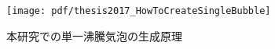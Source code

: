 \begin{figure}[ht]
\vspace{1zh}
 \begin{center}
  \texttt{[image: pdf/thesis2017\_HowToCreateSingleBubble]}
  \vspace{-1.5zh}
  \caption{本研究での単一沸騰気泡の生成原理}\label{HowToCreateSingleBubble}
 \end{center}
 \vspace{0zh}
\end{figure}
%
%
%
%
%

